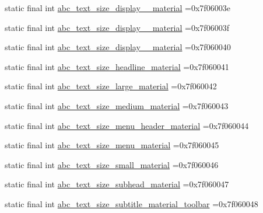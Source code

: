 \begin{DoxyCompactItemize}
\item 
static final int \mbox{\hyperlink{classcom_1_1example_1_1trainawearapplication_1_1_r_1_1dimen_a73e52814f80ef0bc0c44b2acf4b85888}{abc\+\_\+text\+\_\+size\+\_\+display\+\_\+\_\+material}} =0x7f06003e
\item 
static final int \mbox{\hyperlink{classcom_1_1example_1_1trainawearapplication_1_1_r_1_1dimen_adb8e487fd01cbdbc62e99c26dfd42a76}{abc\+\_\+text\+\_\+size\+\_\+display\+\_\+\_\+material}} =0x7f06003f
\item 
static final int \mbox{\hyperlink{classcom_1_1example_1_1trainawearapplication_1_1_r_1_1dimen_acaafde0e12b4fab95641f9186d60a92c}{abc\+\_\+text\+\_\+size\+\_\+display\+\_\+\_\+material}} =0x7f060040
\item 
static final int \mbox{\hyperlink{classcom_1_1example_1_1trainawearapplication_1_1_r_1_1dimen_a3e7f13c01e7df829ad9b54a22dd6bab2}{abc\+\_\+text\+\_\+size\+\_\+headline\+\_\+material}} =0x7f060041
\item 
static final int \mbox{\hyperlink{classcom_1_1example_1_1trainawearapplication_1_1_r_1_1dimen_aa33339074a8edb0db0e02e50bba54f2a}{abc\+\_\+text\+\_\+size\+\_\+large\+\_\+material}} =0x7f060042
\item 
static final int \mbox{\hyperlink{classcom_1_1example_1_1trainawearapplication_1_1_r_1_1dimen_a224709ce9cf80b4c2688f61368361c4e}{abc\+\_\+text\+\_\+size\+\_\+medium\+\_\+material}} =0x7f060043
\item 
static final int \mbox{\hyperlink{classcom_1_1example_1_1trainawearapplication_1_1_r_1_1dimen_a86b74393cd3c285d3fa61dde48f993ff}{abc\+\_\+text\+\_\+size\+\_\+menu\+\_\+header\+\_\+material}} =0x7f060044
\item 
static final int \mbox{\hyperlink{classcom_1_1example_1_1trainawearapplication_1_1_r_1_1dimen_aa7fc09d91c9835b5a723d0ab696567b7}{abc\+\_\+text\+\_\+size\+\_\+menu\+\_\+material}} =0x7f060045
\item 
static final int \mbox{\hyperlink{classcom_1_1example_1_1trainawearapplication_1_1_r_1_1dimen_af38e742882bda0d9e14e1dbc73d39136}{abc\+\_\+text\+\_\+size\+\_\+small\+\_\+material}} =0x7f060046
\item 
static final int \mbox{\hyperlink{classcom_1_1example_1_1trainawearapplication_1_1_r_1_1dimen_a6d70674f5661eec379f0aa996a543c1b}{abc\+\_\+text\+\_\+size\+\_\+subhead\+\_\+material}} =0x7f060047
\item 
static final int \mbox{\hyperlink{classcom_1_1example_1_1trainawearapplication_1_1_r_1_1dimen_ac7db7dfce104ce1482b58c699356d19f}{abc\+\_\+text\+\_\+size\+\_\+subtitle\+\_\+material\+\_\+toolbar}} =0x7f060048

\end{DoxyCompactItemize}
